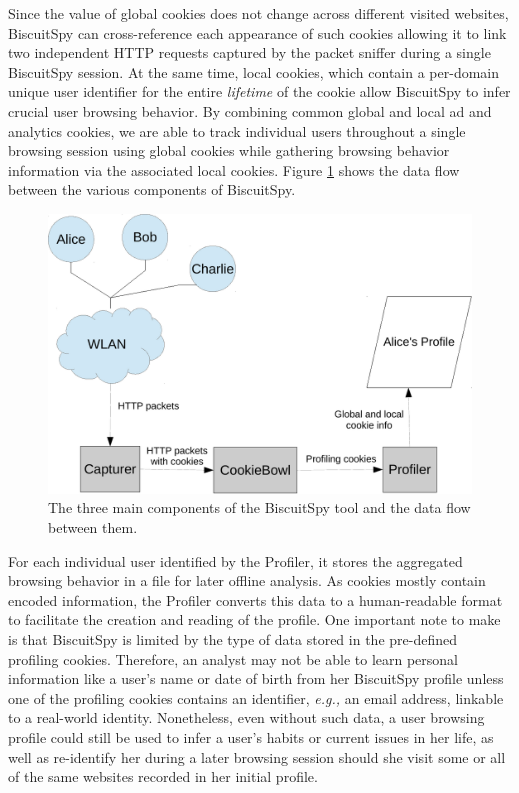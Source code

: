 Since the value of global cookies does not change across different visited websites, BiscuitSpy can cross-reference each appearance of such cookies allowing it to link two independent HTTP requests captured by the packet sniffer during a single BiscuitSpy session. 
At the same time, local cookies, which contain a per-domain unique user identifier for the entire \emph{lifetime} of the cookie allow BiscuitSpy to infer crucial user browsing behavior.
By combining common global and local ad and analytics cookies, we are able to track individual users throughout a single browsing session using global cookies while gathering browsing behavior information via the associated local cookies.
Figure \ref{fig:dataflow} shows the data flow between the various components of BiscuitSpy.

\begin{figure}[h]
\centering
\includegraphics[scale=0.5]{./diagrams/dataflow.pdf}
\caption{The three main components of the BiscuitSpy tool and the data flow between them.}
\label{fig:dataflow}
\end{figure}

For each individual user identified by the Profiler, it stores the aggregated browsing behavior in a file for later offline analysis.
As cookies mostly contain encoded information, the Profiler converts this data to a human-readable format to facilitate the creation and reading of the profile.
One important note to make is that BiscuitSpy is limited by the type of data stored in the pre-defined profiling cookies.
Therefore, an analyst may not be able to learn personal information like a user's name or date of birth from her BiscuitSpy profile unless one of the profiling cookies contains an identifier, \emph{e.g.,} an email address, linkable to a real-world identity.
Nonetheless, even without such data, a user browsing profile could still be used to infer a user's habits or current issues in her life, as well as re-identify her during a later browsing session should she visit some or all of the same websites recorded in her initial profile.


